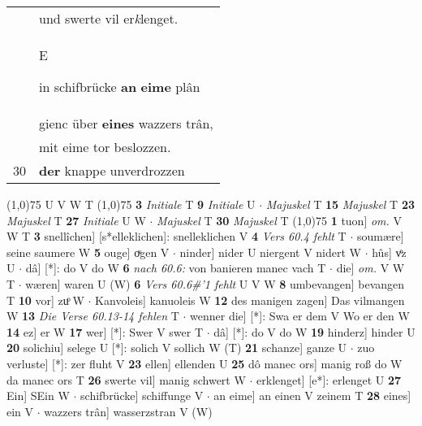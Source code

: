 \documentclass[8pt,a4paper,notitlepage]{article}
\begin{document}
\begin{table}[ht]
\begin{minipage}[t]{0.5\linewidth}
\begin{tabular}{rl}
 & und swerte vil er\textit{k}lenget.\\ 
 & \begin{large}E\end{large}in schifbrücke \textbf{an} \textbf{eime} plân\\ 
 & gienc über \textbf{eines} wazzers trân,\\ 
 & mit eime tor beslozzen.\\ 
30 & \textbf{der} knappe unverdrozzen\\ 
\end{tabular}
\scriptsize
\line(1,0){75} \newline
U V W T \newline
\line(1,0){75} \newline
\textbf{3} \textit{Initiale} T  \textbf{9} \textit{Initiale} U   $\cdot$ \textit{Majuskel} T  \textbf{15} \textit{Majuskel} T  \textbf{23} \textit{Majuskel} T  \textbf{27} \textit{Initiale} U W   $\cdot$ \textit{Majuskel} T  \textbf{30} \textit{Majuskel} T  \newline
\line(1,0){75} \newline
\textbf{1} tuon] \textit{om.} V W T \textbf{3} snellîchen] [s*elleklichen]: snelleklichen V \textbf{4} \textit{Vers 60.4 fehlt} T   $\cdot$ soumære] seine saumere W \textbf{5} ouge] oͮgen V  $\cdot$ ninder] nider U niergent V nidert W  $\cdot$ hûs] vͦz U  $\cdot$ dâ] [*]: do V do W \textbf{6} \textit{nach 60.6:} von banieren manec vach T   $\cdot$ die] \textit{om.} V W T  $\cdot$ wæren] waren U (W) \textbf{6} \textit{Vers 60.6#'1 fehlt} U V W  \textbf{8} umbevangen] bevangen T \textbf{10} vor] zuͦ W  $\cdot$ Kanvoleis] kanuoleis W \textbf{12} des manigen zagen] Das vilmangen W \textbf{13} \textit{Die Verse 60.13-14 fehlen} T   $\cdot$ wenner die] [*]: Swa er dem V Wo er den W \textbf{14} ez] er W \textbf{17} wer] [*]: Swer V swer T  $\cdot$ dâ] [*]: do V do W \textbf{19} hinderz] hinder U \textbf{20} solichiu] selege U [*]: solich V sollich W (T) \textbf{21} schanze] ganze U  $\cdot$ zuo verluste] [*]: zer fluht V \textbf{23} ellen] ellenden U \textbf{25} dô manec ors] manig roß do W da manec ors T \textbf{26} swerte vil] manig schwert W  $\cdot$ erklenget] [e*]: erlenget U \textbf{27} Ein] SEin W  $\cdot$ schifbrücke] schiffunge V  $\cdot$ an eime] an einen V zeinem T \textbf{28} eines] ein V  $\cdot$ wazzers trân] wasserzstran V (W) \newline
\end{minipage}
\end{table}
\end{document}
